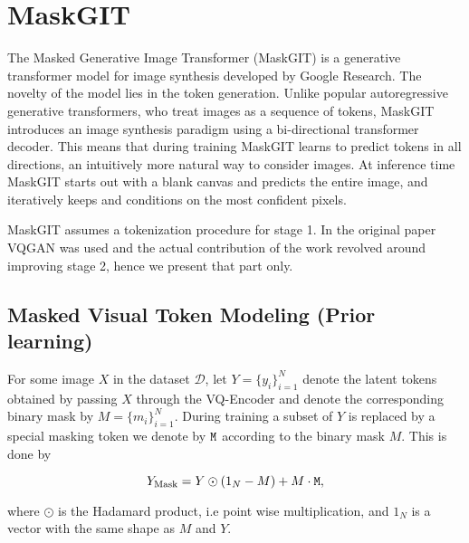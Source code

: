 \documentclass[../../thesis.tex]{subfiles}
\begin{document}





\section{MaskGIT}

The Masked Generative Image Transformer (MaskGIT)\cite{chang2022maskgit} is a generative transformer model for image synthesis developed by Google Research. The novelty of the model lies in the token generation. Unlike popular autoregressive generative transformers, who treat images as a sequence of tokens, MaskGIT introduces an image synthesis paradigm using a bi-directional transformer decoder. This means that during training MaskGIT learns to predict tokens in all directions, an intuitively more natural way to consider images. At inference time MaskGIT starts out with a blank canvas and predicts the entire image, and iteratively keeps and conditions on the most confident pixels.\newline

MaskGIT assumes a tokenization procedure for stage 1. In the original paper \cite{chang2022maskgit} VQGAN \cite{VQGAN} was used and the actual contribution of the work revolved around improving stage 2, hence we present that part only. 

\subsection{Masked Visual Token Modeling (Prior learning)}

For some image $X$ in the dataset $\mathcal{D}$, let $Y = \{y_i\}_{i=1}^N$ denote the latent tokens obtained by passing $X$ through the VQ-Encoder and denote the corresponding binary mask by $M = \{m_i\}_{i=1}^N$. During training a subset of $Y$ is replaced by a special masking token we denote by $\texttt{M}$ according to the binary mask $M$. This is done by 

\begin{equation}
    Y_\text{Mask} = Y\odot (1_N-M) +  M\cdot\texttt{M},
\end{equation}

where $\odot$ is the Hadamard product, i.e point wise multiplication, and $1_N$ is a vector with the same shape as $M$ and $Y$.\newline
\end{document}
